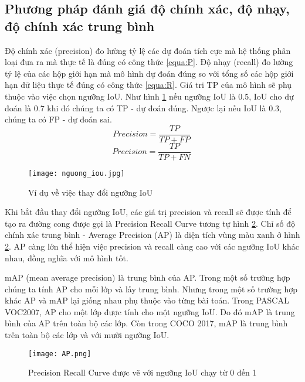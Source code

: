 \documentclass[../the.tex]{subfiles}
\begin{document}
\subsection{Phương pháp đánh giá độ chính xác, độ nhạy, độ chính xác trung bình}
{\fontsize{13}{12} \selectfont
	Độ chính xác (precision) đo lường tỷ lệ các dự đoán tích cực mà hệ thống phân loại đưa ra
	mà thực tế là đúng có công thức \ref{equa:P}.
	Độ nhạy (recall) đo lường tỷ lệ của các hộp giới hạn mà mô hình dự đoán đúng so với tổng số các hộp giới hạn dữ liệu thực tế đúng có công thức \ref{equa:R}.
	Giá tri TP của mô hình sẽ phụ thuộc vào việc chọn ngưỡng IoU.
	Như hình \ref{fig:nguong_iou} nếu ngưỡng IoU là 0.5, IoU cho dự đoán là 0.7 khi đó chúng ta có TP - dự đoán đúng. Ngược lại nếu IoU là 0.3, chúng ta có FP - dự đoán sai.
	\begin{equation}
		Precision = \frac{TP}{TP+FP}\
		\label{equa:P}
	\end{equation}
	\begin{equation}
		Precision = \frac{TP}{TP+FN}\
		\label{equa:R}
	\end{equation}
}
\begin{figure}[H]
	\centering
	\texttt{[image: nguong\_iou.jpg]}
	\caption{Ví dụ về việc thay đổi ngưỡng IoU}
	\label{fig:nguong_iou}
\end{figure}

{\fontsize{13}{12} \selectfont
	Khi bắt đầu thay đổi ngưỡng IoU, các giá trị precision và recall sẽ được tính để tạo ra đường cong được gọi là Precision Recall Curve tương tự hình \ref{fig:ap}.
	Chỉ số độ chính xác trung bình - Average Precision (AP) là diện tích vùng màu xanh ở hình \ref{fig:ap}. AP càng lớn thể hiện việc precision và recall càng cao với các ngưỡng IoU khác nhau, đồng nghĩa với mô hình tốt.
}

\bigskip

{\fontsize{13}{12} \selectfont
	mAP (mean average precision) là trung bình của AP. Trong một số trường hợp chúng ta tính AP cho mỗi lớp và lấy trung bình. Nhưng trong một số trường hợp khác AP và mAP lại giống nhau phụ thuộc vào từng bài toán.
	Trong PASCAL VOC2007, AP cho một lớp được tính cho một ngưỡng IoU. Do đó mAP là trung bình của AP trên toàn bộ các lớp.
	Còn trong COCO 2017, mAP là trung bình trên toàn bộ các lớp và với mười ngưỡng IoU.
}

\begin{figure}[H]
	\centering
	\texttt{[image: AP.png]}
	\caption{Precision Recall Curve được vẽ với ngưỡng IoU chạy từ 0 đến 1}
	\label{fig:ap}
\end{figure}
\end{document}
